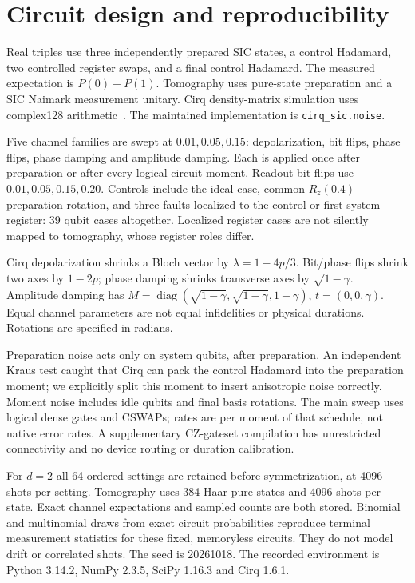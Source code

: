 \documentclass[11pt]{article}
\begin{document}
\section{Circuit design and reproducibility}
Real triples use three independently prepared SIC states, a control Hadamard,
two controlled register swaps, and a final control Hadamard. The measured
expectation is $P(0)-P(1)$. Tomography uses pure-state preparation and a SIC
Naimark measurement unitary. Cirq density-matrix simulation uses complex128
arithmetic~\cite{cirq}. The maintained implementation is \texttt{cirq\_sic.noise}.

Five channel families are swept at $0.01,0.05,0.15$: depolarization, bit flips,
phase flips, phase damping and amplitude damping. Each is applied once after
preparation or after every logical circuit moment. Readout bit flips use
$0.01,0.05,0.15,0.20$. Controls include the ideal case, common $R_z(0.4)$
preparation rotation, and three faults localized to the control or first
system register: 39 qubit cases altogether. Localized register cases are not
silently mapped to tomography, whose register roles differ.

Cirq depolarization shrinks a Bloch vector by $\lambda=1-4p/3$.
Bit/phase flips shrink two axes by $1-2p$; phase damping shrinks transverse
axes by $\sqrt{1-\gamma}$. Amplitude damping has
$M=\operatorname{diag}(\sqrt{1-\gamma},\sqrt{1-\gamma},1-\gamma)$,
$t=(0,0,\gamma)$. Equal channel parameters are not equal infidelities or
physical durations. Rotations are specified in radians.

Preparation noise acts only on system qubits, after preparation. An independent
Kraus test caught that Cirq can pack the control Hadamard into the preparation
moment; we explicitly split this moment to insert anisotropic noise correctly.
Moment noise includes idle qubits and final basis rotations. The main sweep uses
logical dense gates and CSWAPs; rates are per moment of that schedule, not native
error rates. A supplementary CZ-gateset compilation has unrestricted connectivity
and no device routing or duration calibration.

For $d=2$ all 64 ordered settings are retained before symmetrization, at 4096
shots per setting. Tomography uses 384 Haar pure states and 4096 shots per state.
Exact channel expectations and sampled counts are both stored. Binomial and
multinomial draws from exact circuit probabilities reproduce terminal measurement
statistics for these fixed, memoryless circuits. They do not model drift or
correlated shots. The seed is 20261018. The recorded environment is Python 3.14.2,
NumPy 2.3.5, SciPy 1.16.3 and Cirq 1.6.1.
\end{document}
